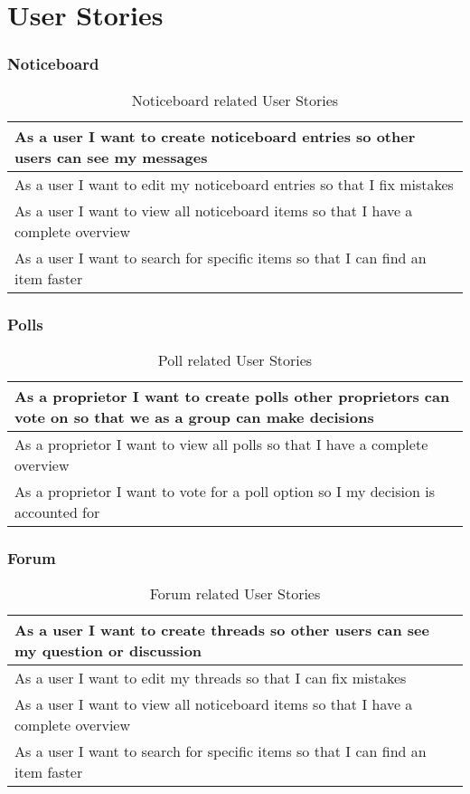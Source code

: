 \chapter{User Stories} \label{app:userstories}
\subsection{Noticeboard}
\begin{table}[H]
    \begin{tabularx}{\linewidth}{|X|}
      \hline
        As a user I want to create noticeboard entries so other users can see my messages \\
       \hline
        As a user I want to edit my noticeboard entries so that I fix mistakes \\
       \hline
        As a user I want to view all noticeboard items so that I have a complete overview \\
       \hline
        As a user I want to search for specific items so that I can find an item faster \\
       \hline 
    \end{tabularx}
    \caption{Noticeboard related User Stories}
  \end{table}

\subsection{Polls}
\begin{table}[H]
  \begin{tabularx}{\linewidth}{|X|}
    \hline
      As a proprietor I want to create polls other proprietors can vote on so that we as a group can make decisions \\
     \hline
      As a proprietor I want to view all polls so that I have a complete overview \\
     \hline
      As a proprietor I want to vote for a poll option so I my decision is accounted for \\
     \hline 
  \end{tabularx}
  \caption{Poll related User Stories}
\end{table}

\subsection{Forum}
\begin{table}[H]
  \begin{tabularx}{\linewidth}{|X|}
    \hline
      As a user I want to create threads so other users can see my question or discussion \\
     \hline
      As a user I want to edit my threads  so that I can fix mistakes \\
     \hline
      As a user I want to view all noticeboard items so that I have a complete overview \\
     \hline
      As a user I want to search for specific items so that I can find an item faster \\
     \hline 
  \end{tabularx}
  \caption{Forum related User Stories}
\end{table}

